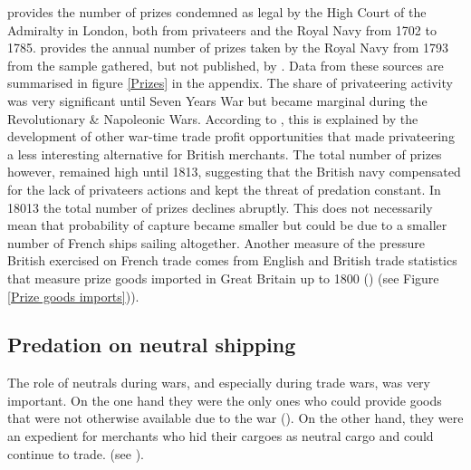 \documentclass[12pt,a4paper,notitlepage,english]{article}
\begin{document}
\cite{Starkey1990} provides the number of prizes condemned as legal by the High Court of the Admiralty in London, both from privateers and the Royal Navy from 1702 to 1785. 
\cite{Benjamin2009} provides the annual number of prizes taken by the Royal Navy from 1793 from the sample gathered, but not published, by \cite{Hill1998}.
Data from these sources are summarised in figure \ref{Prizes} in the appendix.
The share of privateering activity was very significant until Seven Years War but became marginal during the Revolutionary \& Napoleonic Wars. According to \cite{Hillmann2011}, this is explained by the development of other war-time trade profit opportunities that made privateering a less interesting alternative for British merchants. The total number of prizes however, remained high until 1813, suggesting that the British navy compensated for the lack of privateers actions and kept the threat of predation constant.
In 18013 the total number of prizes declines abruptly. This does not necessarily mean that probability of capture became smaller but could be due to a smaller number of French ships sailing altogether. 
Another measure of the pressure British exercised on French trade comes from English and British trade statistics that measure prize goods imported in Great Britain up to 1800 (\cite{Ashton1960}) (see Figure \ref{Prize goods imports})).


\subsection{Predation on neutral shipping}
The role of neutrals during wars, and especially during trade wars, was very important. On the one hand they were the only ones who could provide goods that were not otherwise available due to the war (\cite{Hedberg2015}). On the other hand, they were an expedient for merchants who hid their cargoes as neutral cargo and could continue to trade. (see \cite{Carriere1973,Schnakenbourg2013,Schnakenbourg2015}). 
\end{document}
